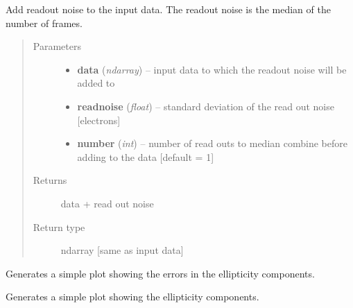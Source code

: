 \documentclass[a4paper,12pt,english]{sphinxmanual}
\begin{document}
\begin{fulllineitems}
\label{reduction:analysis.biasCalibration.addReadoutNoise}
Add readout noise to the input data. The readout noise is the median of the number of frames.
\begin{quote}\begin{description}
\item[{Parameters}] \leavevmode\begin{itemize}
\item {} 
\textbf{data} (\emph{ndarray}) -- input data to which the readout noise will be added to

\item {} 
\textbf{readnoise} (\emph{float}) -- standard deviation of the read out noise {[}electrons{]}

\item {} 
\textbf{number} (\emph{int}) -- number of read outs to median combine before adding to the data {[}default = 1{]}

\end{itemize}

\item[{Returns}] \leavevmode
data + read out noise

\item[{Return type}] \leavevmode
ndarray {[}same as input data{]}

\end{description}\end{quote}

\end{fulllineitems}


\begin{fulllineitems}
\label{reduction:analysis.biasCalibration.plotDeltaEs}
Generates a simple plot showing the errors in the ellipticity components.

\end{fulllineitems}


\begin{fulllineitems}
\label{reduction:analysis.biasCalibration.plotEs}
Generates a simple plot showing the ellipticity components.

\end{fulllineitems}
\end{document}
